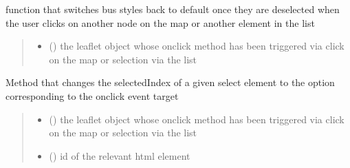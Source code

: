 \documentclass[letterpaper,10pt,english]{sphinxmanual}
\begin{document}
\begin{fulllineitems}
\label{\detokenize{docs_gui/js_api/urbs_editor/generate_urbs_setup_editor:resetLoadBusStyle}}
\pysigstartsignatures
{}
\pysigstopsignatures
\sphinxAtStartPar
function that switches bus styles back to default once they are deselected when the user clicks on another node on the map or another element in the list
\begin{quote}\begin{description}
\begin{itemize}
\item {} 
\sphinxAtStartPar
{} () \textendash{} the leaflet object whose onclick method has been triggered via click on the map or selection via the list

\end{itemize}

\end{description}\end{quote}

\end{fulllineitems}


\begin{fulllineitems}
\label{\detokenize{docs_gui/js_api/urbs_editor/generate_urbs_setup_editor:highlightSelectedElementInList}}
\pysigstartsignatures
{}
\pysigstopsignatures
\sphinxAtStartPar
Method that changes the selectedIndex of a given select element to the option corresponding to the onclick event target
\begin{quote}\begin{description}
\begin{itemize}
\item {} 
\sphinxAtStartPar
{} () \textendash{} the leaflet object whose onclick method has been triggered via click on the map or selection via the list

\item {} 
\sphinxAtStartPar
{} () \textendash{} id of the relevant html element

\end{itemize}

\end{description}\end{quote}

\end{fulllineitems}
\end{document}
